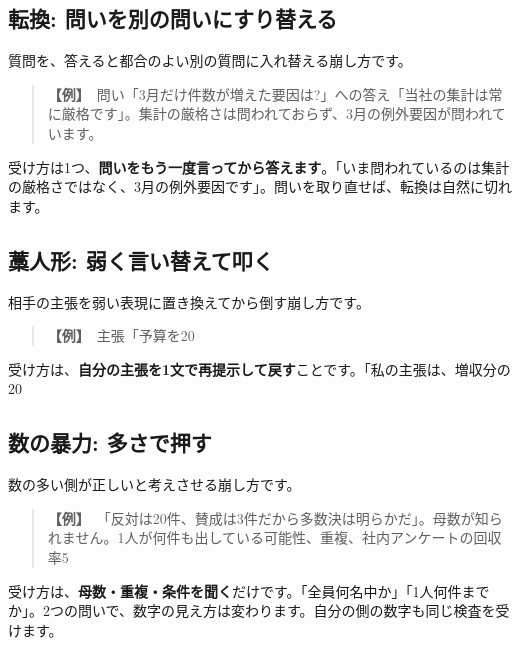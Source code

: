 \documentclass{article}
\begin{document}
\subsection{転換: 問いを別の問いにすり替える}

質問を、答えると都合のよい別の質問に入れ替える崩し方です。

\begin{quote}
\textbf{【例】}\ 問い「3月だけ件数が増えた要因は?」への答え「当社の集計は常に厳格です」。集計の厳格さは問われておらず、3月の例外要因が問われています。
\end{quote}

受け方は1つ、\textbf{問いをもう一度言ってから答えます}。「いま問われているのは集計の厳格さではなく、3月の例外要因です」。問いを取り直せば、転換は自然に切れます。

\subsection{藁人形: 弱く言い替えて叩く}

相手の主張を弱い表現に置き換えてから倒す崩し方です。

\begin{quote}
\textbf{【例】}\ 主張「予算を20%
\end{quote}

受け方は、\textbf{自分の主張を1文で再提示して戻す}ことです。「私の主張は、増収分の20%

\subsection{数の暴力: 多さで押す}

数の多い側が正しいと考えさせる崩し方です。

\begin{quote}
\textbf{【例】}\ 「反対は20件、賛成は3件だから多数決は明らかだ」。母数が知られません。1人が何件も出している可能性、重複、社内アンケートの回収率5%
\end{quote}

受け方は、\textbf{母数・重複・条件を聞く}だけです。「全員何名中か」「1人何件までか」。2つの問いで、数字の見え方は変わります。自分の側の数字も同じ検査を受けます。
\end{document}
